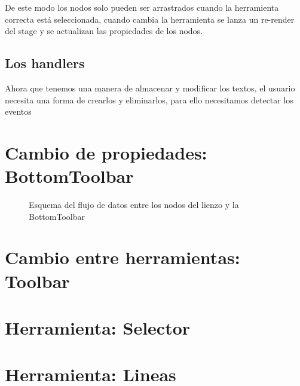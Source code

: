 De este modo los nodos solo pueden ser arrastrados cuando la herramienta correcta está
seleccionada, cuando cambia la herramienta se lanza un re-render del stage y se actualizan
las propiedades de los nodos.

\newpage
\subsection{Los handlers}

Ahora que tenemos una manera de almacenar y modificar los textos, 
el usuario necesita una forma de crearlos y eliminarlos, para ello necesitamos 
detectar los eventos 

\newpage
\section{Cambio de propiedades: BottomToolbar}

\begin{figure}[!h]
  \centering
  \noindent{}
  \caption{Esquema del flujo de datos entre los nodos del lienzo y la BottomToolbar}
\end{figure}

\section{Cambio entre herramientas: Toolbar}

\section{Herramienta: Selector}
\section{Herramienta: Lineas}
